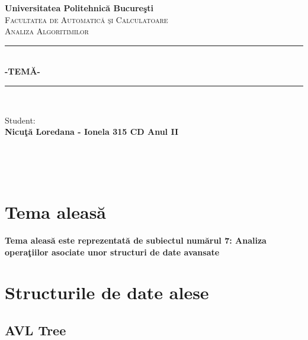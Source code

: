 \documentclass[12pt]{article}
\newcommand{\mydate}{\DTMdisplaydate{2017}{12}{14}{-1}}
\begin{document}
\begin{titlepage}
\newcommand{\HRule}{\rule{\linewidth}{0.5mm}} 
\center

\textbf{\LARGE   Universitatea Politehnic\u{a} Bucure\c{s}ti} \\[0.7cm] 
\textsc{\Large \hspace{0.2cm} Facultatea de Automatic\u{a} \c{s}i Calculatoare} \\[2cm]
\center
\textsc{\LARGE Analiza Algoritimilor}\\[1.0cm] 

\center
\HRule \\[0.4cm]
{ \huge \bfseries -TEM\u{A}-}\\[0.4cm] 
\HRule \\[1.5cm]
 

\begin{minipage}{0.9\textwidth}
\begin{flushleft} \large
\LARGE{Student:}\\
 \Large \textbf{Nicu\c{t}\u{a} Loredana - Ionela 315 CD Anul II} 
\end{flushleft}
\end{minipage}
~

\vspace{3.0cm}
{\large \mydate}\\[4cm]
\end{titlepage}

\newpage
\pagestyle{empty}

\tableofcontents

\thispagestyle{empty}
\cleardoublepage
\newpage
\pagestyle{headings}
\setcounter{page}{1}

\section{Tema aleas\u{a}}

\textbf{\hspace{7mm} Tema aleas\u{a} este reprezentat\u{a} de subiectul num\u{a}rul 7: Analiza opera\c{t}iilor asociate unor structuri de date avansate}

\section{Structurile de date alese}

\subsection{AVL Tree}
\end{document}
